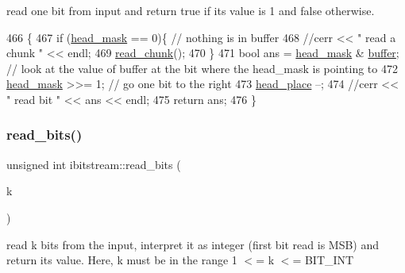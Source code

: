 read one bit from input and return true if its value is 1 and false otherwise. 


\begin{DoxyCode}
466                          \{
467   \textcolor{keywordflow}{if} (\hyperlink{classibitstream_a48cd41991b6c29ea5120b53873a72a70}{head\_mask} == 0)\{ \textcolor{comment}{// nothing is in buffer}
468     \textcolor{comment}{//cerr << " read a chunk " << endl;}
469     \hyperlink{classibitstream_ac62c26004436d83f337f4aeba0895e20}{read\_chunk}();
470   \}
471   \textcolor{keywordtype}{bool} ans = \hyperlink{classibitstream_a48cd41991b6c29ea5120b53873a72a70}{head\_mask} & \hyperlink{classibitstream_a73f0b24d3d4402369f1abbb43f7f70ef}{buffer}; \textcolor{comment}{// look at the value of buffer at the bit where the
       head\_mask is pointing to}
472   \hyperlink{classibitstream_a48cd41991b6c29ea5120b53873a72a70}{head\_mask} >>= 1; \textcolor{comment}{// go one bit to the right}
473   \hyperlink{classibitstream_a7b96359ac1534a5565e6e9b0cc53a0b3}{head\_place} --;
474   \textcolor{comment}{//cerr << " read bit " << ans << endl;}
475   \textcolor{keywordflow}{return} ans;
476 \}
\end{DoxyCode}
\mbox{\label{classibitstream_a2fdcaecf10fefa6942dcd5286a2696e0}} 
\subsubsection{\texorpdfstring{read\+\_\+bits()}{read\_bits()}\hspace{0.1cm}{\footnotesize\ttfamily [1/2]}}
{\footnotesize\ttfamily unsigned int ibitstream\+::read\+\_\+bits (\begin{DoxyParamCaption}\item[{unsigned int}]{k }\end{DoxyParamCaption})}



read k bits from the input, interpret it as integer (first bit read is M\+SB) and return its value. Here, k must be in the range 1 $<$= k $<$= B\+I\+T\+\_\+\+I\+NT 


